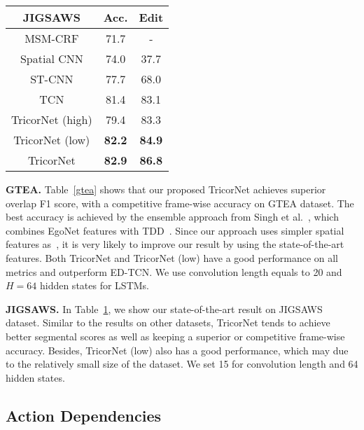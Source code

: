 \documentclass{article}
\begin{document}
\begin{table}
{		\label{jigsaws}
		\begin{tabular}{|c|c|c|}
			\hline
			\textbf{JIGSAWS}     & \textbf{Acc.} & \textbf{Edit} \\ \hline
			MSM-CRF \cite{tao}   & 71.7              & -                   \\
			Spatial CNN \cite{scnn} & 74.0              & 37.7                \\
			ST-CNN \cite{scnn}      & 77.7              & 68.0                \\
			TCN \cite{tcnw}         & 81.4              & 83.1                \\ \hline
			TricorNet (high)                & 79.4              & 83.3               \\
			TricorNet (low)                & \textbf{82.2}              & \textbf{84.9}               \\
			TricorNet                 & \textbf{82.9}              & \textbf{86.8}               \\
			\hline
		\end{tabular}
	}
\end{table}

\noindent \textbf{GTEA.} \quad Table~\ref{gtea} shows that our proposed TricorNet achieves superior overlap F1 score, with a competitive frame-wise accuracy on GTEA dataset. The best accuracy is achieved by the ensemble approach from Singh et al.~\cite{ego}, which combines EgoNet features with TDD~\cite{tdd}. Since our approach uses simpler spatial features as~\cite{LeFlViCVPR2017}, it is very likely to improve our result by using the state-of-the-art features. Both TricorNet and TricorNet (low) have a good performance on all metrics and outperform ED-TCN. We use convolution length equals to 20 and $H = 64$ hidden states for LSTMs. 

\noindent \textbf{JIGSAWS.} \quad In Table~\ref{jigsaws}, we show our state-of-the-art result on JIGSAWS dataset. Similar to the results on other datasets, TricorNet tends to achieve better segmental scores as well as keeping a superior or competitive frame-wise accuracy. Besides, TricorNet (low) also has a good performance, which may due to the relatively small size of the dataset. We set 15 for convolution length and 64 hidden states.


\subsection{Action Dependencies}
\end{document}
